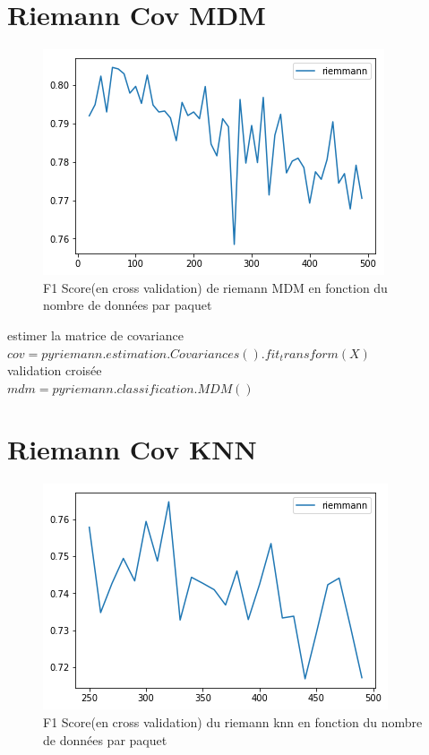 \documentclass{article}
\begin{document}
\section{Riemann Cov MDM }
\begin{figure}[H]
\begin{center}
\includegraphics[scale=1]{images/riemann_cov_MDM_f1Score.png}
\end{center}
\caption{F1 Score(en cross validation) de riemann MDM en fonction du nombre de données par paquet}
\end{figure}

estimer la matrice de covariance\\
$
cov = pyriemann.estimation.Covariances().fit_transform(X)
$
\\
validation croisée\\
$
mdm = pyriemann.classification.MDM()
$
\section{Riemann Cov KNN }
\begin{figure}[H]
\begin{center}
\includegraphics[scale=1]{images/riemann_cov_knn_f1Score.png}
\end{center}
\caption{F1 Score(en cross validation) du riemann knn en fonction du nombre de données par paquet}
\end{figure}
\end{document}
